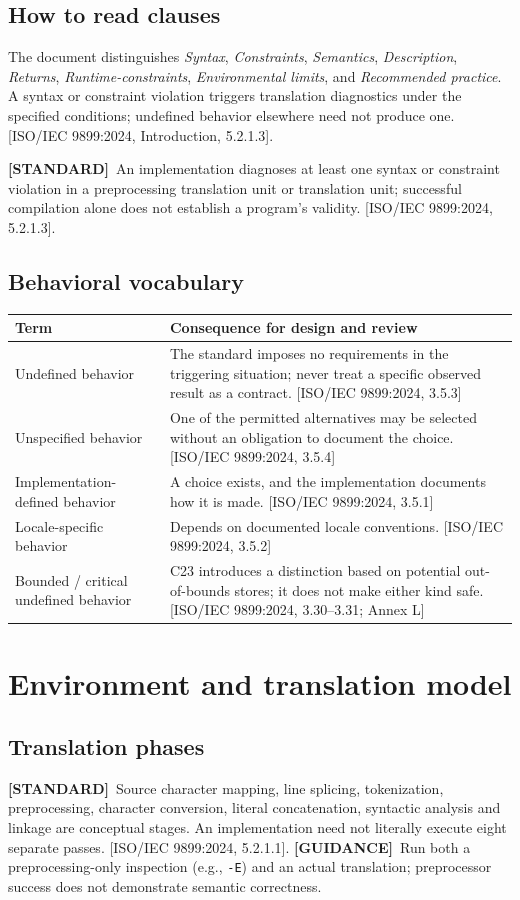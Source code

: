 \documentclass[10pt,letterpaper,oneside]{report}
\newcommand{\refcl}[1]{\textsf{\footnotesize[ISO/IEC 9899:2024, #1]}}
\newcommand{\standard}{\textbf{[STANDARD]}}
\newcommand{\guidance}{\textbf{[GUIDANCE]}}
\begin{document}
\section{How to read clauses}
The document distinguishes \emph{Syntax}, \emph{Constraints}, \emph{Semantics}, \emph{Description}, \emph{Returns}, \emph{Runtime-constraints}, \emph{Environmental limits}, and \emph{Recommended practice}. A syntax or constraint violation triggers translation diagnostics under the specified conditions; undefined behavior elsewhere need not produce one. \refcl{Introduction, 5.2.1.3}.
\begin{keybox}\standard\ An implementation diagnoses at least one syntax or constraint violation in a preprocessing translation unit or translation unit; successful compilation alone does not establish a program's validity. \refcl{5.2.1.3}.\end{keybox}
\section{Behavioral vocabulary}
\begin{longtable}{p{.28\linewidth}p{.65\linewidth}}\toprule Term & Consequence for design and review\\\midrule\endhead
Undefined behavior & The standard imposes no requirements in the triggering situation; never treat a specific observed result as a contract. \refcl{3.5.3}\\
Unspecified behavior & One of the permitted alternatives may be selected without an obligation to document the choice. \refcl{3.5.4}\\
Implementation-defined behavior & A choice exists, and the implementation documents how it is made. \refcl{3.5.1}\\
Locale-specific behavior & Depends on documented locale conventions. \refcl{3.5.2}\\
Bounded / critical undefined behavior & C23 introduces a distinction based on potential out-of-bounds stores; it does not make either kind safe. \refcl{3.30--3.31; Annex L}\\
\bottomrule\end{longtable}
\chapter{Environment and translation model}
\section{Translation phases}
\standard\ Source character mapping, line splicing, tokenization, preprocessing, character conversion, literal concatenation, syntactic analysis and linkage are conceptual stages. An implementation need not literally execute eight separate passes. \refcl{5.2.1.1}.
\guidance\ Run both a preprocessing-only inspection (e.g., \texttt{-E}) and an actual translation; preprocessor success does not demonstrate semantic correctness.
\end{document}
